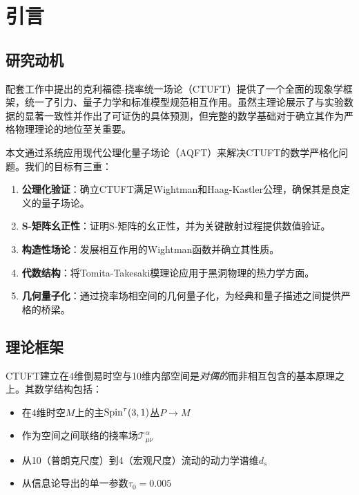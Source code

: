 \section{引言}
\label{sec:intro}

\subsection{研究动机}

配套工作\cite{wang2026ctuft}中提出的克利福德-挠率统一场论（CTUFT）提供了一个全面的现象学框架，统一了引力、量子力学和标准模型规范相互作用。虽然主理论展示了与实验数据的显著一致性并作出了可证伪的具体预测，但完整的数学基础对于确立其作为严格物理理论的地位至关重要。

本文通过系统应用现代公理化量子场论（AQFT）来解决CTUFT的数学严格化问题。我们的目标有三重：

\begin{enumerate}
    \item \textbf{公理化验证}：确立CTUFT满足Wightman和Haag-Kastler公理，确保其是良定义的量子场论。
    
    \item \textbf{S-矩阵幺正性}：证明S-矩阵的幺正性，并为关键散射过程提供数值验证。
    
    \item \textbf{构造性场论}：发展相互作用的Wightman函数并确立其性质。
    
    \item \textbf{代数结构}：将Tomita-Takesaki模理论应用于黑洞物理的热力学方面。
    
    \item \textbf{几何量子化}：通过挠率场相空间的几何量子化，为经典和量子描述之间提供严格的桥梁。
\end{enumerate}

\subsection{理论框架}

CTUFT建立在4维倒易时空与10维内部空间是\textit{对偶的}而非相互包含的基本原理之上。其数学结构包括：

\begin{itemize}
    \item 在4维时空$M$上的主$\mathrm{Spin}^\tau(3,1)$丛$P \to M$
    \item 作为空间之间联络的挠率场$\mathcal{T}^\alpha_{\mu\nu}$
    \item 从10（普朗克尺度）到4（宏观尺度）流动的动力学谱维$d_s$
    \item 从信息论导出的单一参数$\tau_0 = 0.005$
\end{itemize}

